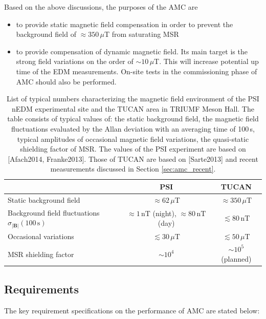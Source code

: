 Based on the above discussions, the purposes of the AMC are 
\begin{itemize}
    \item to provide static magnetic field compensation in order to prevent the background field of $\approx 350\,\mu$T from saturating MSR 
    \item to provide compensation of dynamic magnetic field. Its main target is the strong field variations on the order of $\sim 10\,\mu$T. This will increase potential up time of the EDM measurements. On-site tests in the commissioning phase of AMC should also be performed.
\end{itemize}

\begin{table}[hbt]
\centering 
\begin{tabular}{|l||c|c|}
\hline

 & \multicolumn{1}{c|}{\textbf{PSI}} & \multicolumn{1}{c|}{\textbf{TUCAN}} \\ \hline\hline 
Static background field  & $\approx62\,\mu$T & $\approx 350\,\mu$T                       \\ \hline
Background field fluctuations  $\sigma_{|\mathbf{B}|}(100\,\mathrm{s})$ & $\approx 1\,\mathrm{nT}$ (night), $\approx 80\,\mathrm{nT}$ (day) & $\lesssim 80\,\mathrm{nT}$ \\ \hline
Occasional variations    & $\lesssim30\,\mu$T   & $\lesssim 50\,\mu$T            \\ \hline
 MSR shielding  factor       &    $\sim 10^4$   &   $\sim 10^5$ (planned)  \\ \hline 
\end{tabular}
\caption{List of typical numbers characterizing the magnetic field environment of the PSI nEDM experimental site and the TUCAN area in TRIUMF Meson Hall. The table consists of typical values of: the static background field, the magnetic field fluctuations evaluated by the Allan deviation with an averaging time of 100\,s, typical amplitudes of occasional magnetic field variations, the quasi-static shielding factor of MSR. The values of the PSI experiment are based on [Afach2014, Franke2013]. Those of TUCAN are based on [Sarte2013] and recent measurements discussed in Section \ref{sec:amc_recent}. 
}
\label{tab:amc_comparaion}
\end{table}


\subsection{Requirements}
The key requirement specifications on the performance of AMC are stated below:

